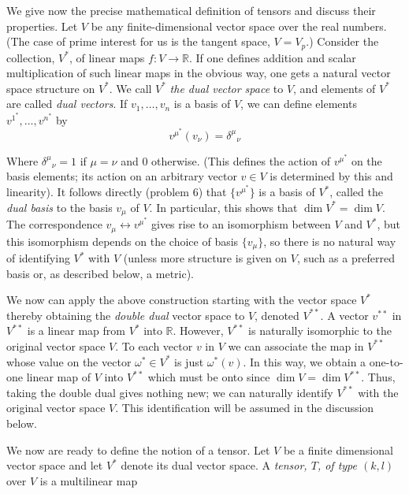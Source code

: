 We give now the precise mathematical definition of tensors and discuss their properties. Let $V$ be any finite-dimensional vector space over the real numbers. (The case of prime interest for us is the tangent space, $V=V_p$.) Consider the collection, $V^*$, of linear maps $f:V\to\mathbb{R}$. If one defines addition and scalar multiplication of such linear maps in the obvious way, one gets a natural vector space structure on $V^*$. We call $V^*$ \emph{the dual vector space} to $V$, and elements of $V^*$ are called \emph{dual vectors}. If $v_1,\ldots,v_n$ is a basis of $V$, we can define elements $v^{1^*},\ldots,v^{n^*}$ by
\begin{equation}
    v^{\mu^*}(v_\nu)={\delta^\mu}_\nu
    \label{2.3.1}
\end{equation}

Where ${\delta^\mu}_\nu=1$ if $\mu=\nu$ and $0$ otherwise. (This defines the action of $v^{\mu^*}$ on the basis elements; its action on an arbitrary vector $v\in V$ is determined by this and linearity). It follows directly (problem 6) that $\{v^{\mu^*}\}$ is a basis of $V^*$, called the \emph{dual basis} to the basis ${v_\mu}$ of $V$. In particular, this shows that $\dim V^* = \dim V$. The correspondence $v_\mu\leftrightarrow v^{\mu^*}$ gives rise to an isomorphism between $V$ and $V^*$, but this isomorphism depends on the choice of basis $\{v_\mu\}$, so there is no natural way of identifying $V^*$ with $V$ (unless more structure is given on $V$, such as a preferred basis or, as described below, a metric).

We now can apply the above construction starting with the vector space $V^*$ thereby obtaining the \emph{double dual} vector space to $V$, denoted $V^{**}$. A vector $v^{**}$ in $V^{**}$ is a linear map from $V^*$ into $\mathbb{R}$. However, $V^{**}$ is naturally isomorphic to the original vector space $V$. To each vector $v$ in $V$ we can associate the map in $V^{**}$ whose value on the vector $\omega^*\in V^*$ is just $\omega^*(v)$. In this way, we obtain a one-to-one linear map of $V$ into $V^{**}$ which must be onto since $\dim V = \dim V^{**}$. Thus, taking the double dual gives nothing new; we can naturally identify $V^{**}$ with the original vector space $V$. This identification will be assumed in the discussion below.

We now are ready to define the notion of a tensor. Let $V$ be a finite dimensional vector space and let $V^*$ denote its dual vector space. A \emph{tensor, $T$, of type $(k,l)$} over $V$ is a multilinear map

